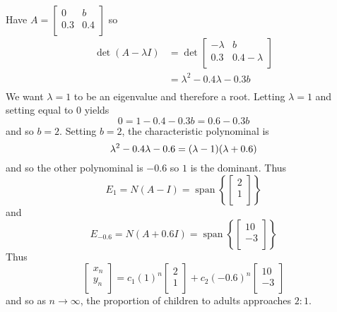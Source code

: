 \documentclass{article}
\DeclareMathOperator{\spn}{span}
\begin{document}
\begin{example}
      Have $A =
      \begin{bmatrix}
        0 & b\\
        0.3 & 0.4\\
      \end{bmatrix}$ so
      \begin{align*}
        \det (A - \lambda I) &= \det
        \begin{bmatrix}
          -\lambda & b\\
          0.3 & 0.4-\lambda\\
        \end{bmatrix}\\
        &= \lambda^2 - 0.4\lambda -0.3b\\
      \end{align*}
      We want $\lambda = 1$ to be an eigenvalue and therefore a root. Letting $\lambda = 1$ and setting equal to $0$ yields \[
        0 = 1 - 0.4 - 0.3b = 0.6 - 0.3b
      \] and so $b = 2$. Setting $b = 2$, the characteristic polynominal is \[
        \lambda^2 - 0.4\lambda - 0.6 = (\lambda - 1)(\lambda + 0.6)\\
      \] and so the other polynominal is $-0.6$ so $1$ is the dominant. Thus \[
        E_1 = N(A - I) = \spn \left\{
          \begin{bmatrix}
            2\\1\\
        \end{bmatrix}\right\}
      \] and \[
        E_{-0.6} = N(A + 0.6I) = \spn\left\{
          \begin{bmatrix}
            10\\-3\\
        \end{bmatrix}\right\}
      \]
      Thus \[
        \begin{bmatrix}
          x_n\\y_n\\
        \end{bmatrix} = c_1(1)^n
        \begin{bmatrix}
          2\\1\\
        \end{bmatrix} + c_2(-0.6)^n
        \begin{bmatrix}
          10\\-3\\
        \end{bmatrix}
      \] and so as $n \to \infty$, the proportion of children to adults approaches $2:1$.
    \end{example}
\end{document}
